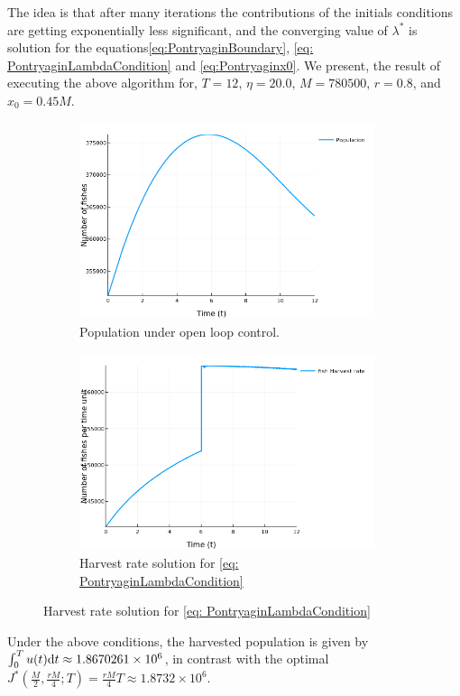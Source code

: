 The idea is that after many iterations the contributions of the initials conditions are getting exponentially less significant, and the converging value of $\lambda^*$ is solution for the equations\ref{eq:PontryaginBoundary}, \ref{eq: PontryaginLambdaCondition} and \ref{eq:Pontryaginx0}.
We present, the result of executing the above algorithm for,
$T=12$, $\eta=20.0$, $M=780500$, $r=0.8$, and $x_0=0.45M$.
\begin{figure}[H]
	\caption{Smooth Control for Open Loop Strategy.}
	\begin{subfigure}{0.48\textwidth}
		\includegraphics[width=0.95\textwidth]{Population.png}
		\caption{Population under open loop control.}
	\end{subfigure}
	\begin{subfigure}{0.48\textwidth}
		\includegraphics[width=0.95\textwidth]{Harvest}
		\caption{Harvest rate solution for \ref{eq: PontryaginLambdaCondition} }
	\end{subfigure}
\end{figure}
Under the above conditions, the harvested population is given by $\int_{0}^{T} u(t) \mathrm{d} t \approx 1.8670261\times 10^6$, in contrast with the optimal $J^*(\frac{M}{2}, \frac{rM}{4}; T)=\frac{rM}{4}T\approx1.8732\times 10^6$.
